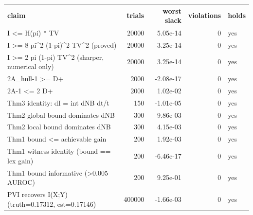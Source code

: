 \begin{tabular}{lrrrl}
\toprule
\textbf{claim} & \textbf{trials} & \textbf{worst slack} & \textbf{violations} & \textbf{holds} \\
\midrule
I \textless{}= H(pi) * TV & 20000 & 5.05e-14 & 0 & yes \\
I \textgreater{}= 8 pi\textasciicircum{}2 (1-pi)\textasciicircum{}2 TV\textasciicircum{}2 (proved) & 20000 & 3.25e-14 & 0 & yes \\
I \textgreater{}= 2 pi (1-pi) TV\textasciicircum{}2 (sharper, numerical only) & 20000 & 3.25e-14 & 0 & yes \\
2A\_hull-1 \textgreater{}= D+ & 2000 & -2.08e-17 & 0 & yes \\
2A-1 \textless{}= 2 D+ & 2000 & 1.02e-02 & 0 & yes \\
Thm3 identity: dI = int dNB dt/t & 150 & -1.01e-05 & 0 & yes \\
Thm2 global bound dominates dNB & 300 & 9.86e-03 & 0 & yes \\
Thm2 local bound dominates dNB & 300 & 4.15e-03 & 0 & yes \\
Thm1 bound \textless{}= achievable gain & 200 & 1.92e-03 & 0 & yes \\
Thm1 witness identity (bound == lex gain) & 200 & -6.46e-17 & 0 & yes \\
Thm1 bound informative (\textgreater{}0.005 AUROC) & 200 & 9.25e-01 & 0 & yes \\
PVI recovers I(X;Y) (truth=0.17312, est=0.17146) & 400000 & -1.66e-03 & 0 & yes \\
\bottomrule
\end{tabular}
